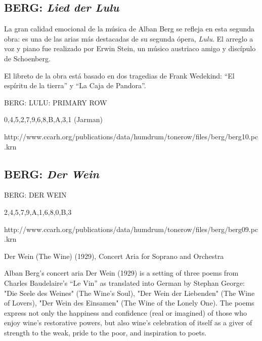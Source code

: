     	\subsection{BERG: \textit{Lied der Lulu}}
        	La gran calidad emocional de la música de Alban Berg se refleja en esta segunda obra: es una de las arias más destacadas de su segunda ópera, \textit{Lulu}. El arreglo a voz y piano fue realizado por Erwin Stein, un músico austriaco amigo y discípulo de Schoenberg.
        	
        	El libreto de la obra está basado en dos tragedias de Frank Wedekind: ``El espíritu de la tierra'' y ``La Caja de Pandora''. 
        	
        	
        	
        	

		BERG: LULU: PRIMARY ROW
		
		{0,4,5,2,7,9,6,8,B,A,3,1} (Jarman)
		
		http://www.ccarh.org/publications/data/humdrum/tonerow/files/berg/berg10.pc.krn
            
        
        \subsection{BERG: \textit{Der Wein}}
        
        BERG: DER WEIN
        
        {2,4,5,7,9,A,1,6,8,0,B,3}
        
        http://www.ccarh.org/publications/data/humdrum/tonerow/files/berg/berg09.pc.krn
        
        Der Wein (The Wine) (1929), Concert Aria for Soprano and Orchestra
        
        Alban Berg's concert aria Der Wein (1929) is a setting of three poems from Charles Baudelaire's ``Le Vin'' as translated into German by Stephan George: "Die Seele des Weines" (The Wine's Soul), "Der Wein der Liebenden" (The Wine of Lovers), "Der Wein des Einsamen" (The Wine of the Lonely One). The poems express not only the happiness and confidence (real or imagined) of those who enjoy wine's restorative powers, but also wine's celebration of itself as a giver of strength to the weak, pride to the poor, and inspiration to poets.

